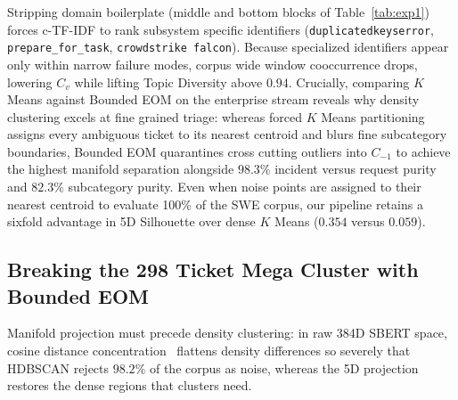 \documentclass[sigconf,nonacm,pbalance]{acmart}
\begin{document}
Stripping domain boilerplate (middle and bottom blocks of Table~\ref{tab:exp1}) forces c-TF-IDF to rank subsystem specific identifiers (\texttt{duplicatedkeyserror}, \texttt{prepare\_for\_task}, \texttt{crowdstrike falcon}). Because specialized identifiers appear only within narrow failure modes, corpus wide window cooccurrence drops, lowering $C_v$ while lifting Topic Diversity above $0.94$. Crucially, comparing $K$ Means against Bounded EOM on the enterprise stream reveals why density clustering excels at fine grained triage: whereas forced $K$ Means partitioning assigns every ambiguous ticket to its nearest centroid and blurs fine subcategory boundaries, Bounded EOM quarantines cross cutting outliers into $C_{-1}$ to achieve the highest manifold separation alongside $98.3\%$ incident versus request purity and $82.3\%$ subcategory purity. Even when noise points are assigned to their nearest centroid to evaluate 100\% of the SWE corpus, our pipeline retains a sixfold advantage in 5D Silhouette over dense $K$ Means ($0.354$ versus $0.059$).

\subsection{Breaking the 298 Ticket Mega Cluster with Bounded EOM}
Manifold projection must precede density clustering: in raw 384D SBERT space, cosine distance concentration~\cite{beyer1999nearest} flattens density differences so severely that HDBSCAN rejects $98.2\%$ of the corpus as noise, whereas the 5D projection restores the dense regions that clusters need.
\end{document}
